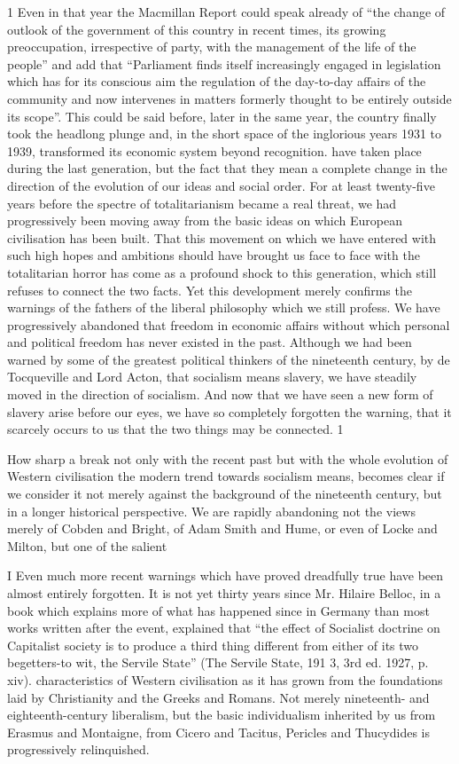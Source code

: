 \documentclass[11pt,openany]{book}
\begin{document}
1 Even in that year the Macmillan Report could speak already of ``the change of outlook of the government of this country in recent times, its growing preoccupation, irrespective of party, with the management of the life of the people'' and add that ``Parliament finds itself increasingly engaged in legislation which has for its conscious aim the regulation of the day-to-day affairs of the community and now intervenes in matters formerly thought to be entirely outside its scope''. This could be said before, later in the same year, the country finally took the headlong plunge and, in the short space of the inglorious years 1931 to 1939, transformed its economic system beyond recognition. have taken place during the last generation, but the fact that they mean a complete change in the direction of the evolution of our ideas and social order. For at least twenty-five years before the spectre of totalitarianism became a real threat, we had progressively been moving away from the basic ideas on which European civilisation has been built. That this movement on which we have entered with such high hopes and ambitions should have brought us face to face with the totalitarian horror has come as a profound shock to this generation, which still refuses to connect the two facts. Yet this development merely confirms the warnings of the fathers of the liberal philosophy which we still profess. We have progressively abandoned that freedom in economic affairs without which personal and political freedom has never existed in the past. Although we had been warned by some of the greatest political thinkers of the nineteenth century, by de Tocqueville and Lord Acton, that socialism means slavery, we have steadily moved in the direction of socialism. And now that we have seen a new form of slavery arise before our eyes, we have so completely forgotten the warning, that it scarcely occurs to us that the two things may be connected. 1

How sharp a break not only with the recent past but with the whole evolution of Western civilisation the modern trend towards socialism means, becomes clear if we consider it not merely against the background of the nineteenth century, but in a longer historical perspective. We are rapidly abandoning not the views merely of Cobden and Bright, of Adam Smith and Hume, or even of Locke and Milton, but one of the salient

I Even much more recent warnings which have proved dreadfully true have been almost entirely forgotten. It is not yet thirty years since Mr. Hilaire Belloc, in a book which explains more of what has happened since in Germany than most works written after the event, explained that ``the effect of Socialist doctrine on Capitalist society is to produce a third thing different from either of its two begetters-to wit, the Servile State'' (The Servile State, 191 3, 3rd ed. 1927, p. xiv). characteristics of Western civilisation as it has grown from the foundations laid by Christianity and the Greeks and Romans. Not merely nineteenth- and eighteenth-century liberalism, but the basic individualism inherited by us from Erasmus and Montaigne, from Cicero and Tacitus, Pericles and Thucydides is progressively relinquished.
\end{document}
